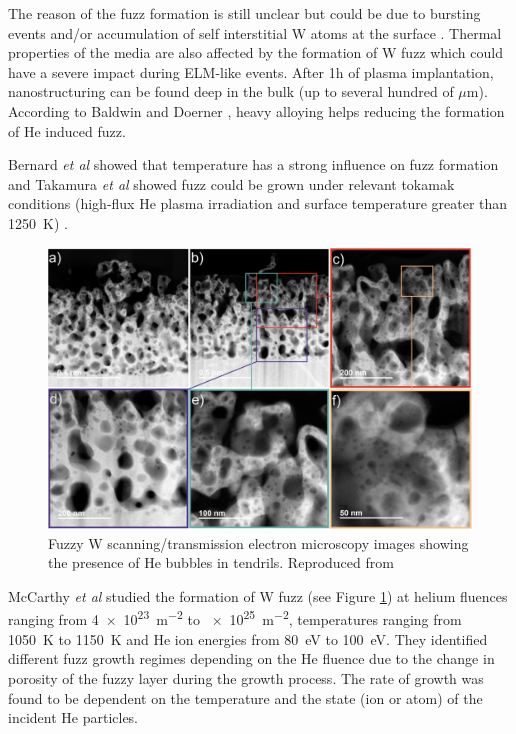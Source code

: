The reason of the fuzz formation is still unclear but could be due to bursting events and/or accumulation of self interstitial W atoms at the surface .
Thermal properties of the media are also affected by the formation of W fuzz  which could have a severe impact during ELM-like events.
After 1h of plasma implantation, nanostructuring can be found deep in the bulk (up to several hundred of $\mu$m).
According to Baldwin and Doerner , heavy alloying helps reducing the formation of He induced fuzz.

Bernard \textit{et al} showed that temperature has a strong influence on fuzz formation  and Takamura \textit{et al} showed fuzz could be grown under relevant tokamak conditions (high-flux He plasma irradiation and surface temperature greater than \SI{1250}{K}) .

\begin{figure} [h!]
    \centering
    \includegraphics[width=\linewidth]{Figures/Chapter1/fuzz_mccarthy.jpg}
    \caption{Fuzzy W scanning/transmission electron microscopy images showing the presence of He bubbles in tendrils. Reproduced from \cite{mccarthy_enhanced_2020}}
    \label{fig: w fuzz mccarthy}
\end{figure}

McCarthy \textit{et al} studied the formation of W fuzz (see Figure \ref{fig: w fuzz mccarthy}) at helium fluences ranging from \SI{4e23}{m^{-2}} to \SI{e25}{m^{-2}}, temperatures ranging from \SI{1050}{K} to \SI{1150}{K} and He ion energies from \SI{80}{eV} to \SI{100}{eV}.
They identified different fuzz growth regimes depending on the He fluence due to the change in porosity of the fuzzy layer during the growth process.
The rate of growth was found to be dependent on the temperature and the state (ion or atom) of the incident He particles.

